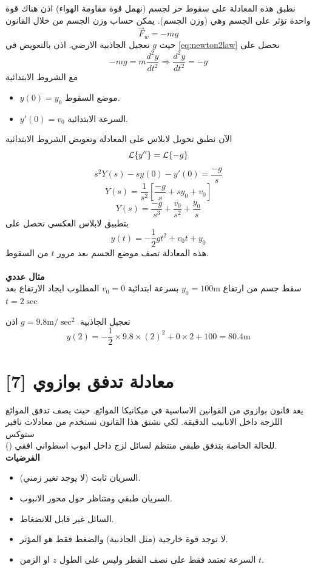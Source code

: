 نطبق هذه المعادلة على سقوط حر لجسم (نهمل قوة مقاومة الهواء) اذن هناك قوة واحدة تؤثر على الجسم وهي (وزن الجسم). يمكن حساب وزن الجسم من خلال القانون 
\[
\vec{F}_w = - mg
\]
حيث $g$ تعجيل الجاذبية الارضي. اذن بالتعويض في \eqref{eq:newton2law} نحصل على 
\begin{equation}
	\label{eq:freefall}
	- mg = m \frac{d^2 y}{dt^2} \Rightarrow \frac{d^2 y}{dt^2}  = -g
\end{equation}
مع الشروط الابتدائية
\begin{itemize}
	\item $y(0) = y_0$ موضع السقوط.
	\item $y'(0) = v_0$ السرعة الابتدائية.
\end{itemize}
الآن نطبق تحويل لابلاس على المعادلة وتعويض الشروط الابتدائية
\[
\mathcal{L}\{y''\} = \mathcal{L}\{-g\}
\]
\[
s^2Y(s) - s y(0) - y'(0) = \frac{-g}{s} 
\]
\[
Y(s) = \frac{1}{s^2} \left[\frac{-g}{s} + sy_0 + v_0\right]
\]
\[
Y(s) = \frac{-g}{s^3} + \frac{v_0}{s^2} + \frac{y_0}{s}
\]
بتطبيق لابلاس العكسي نحصل على
\begin{equation}
	\label{eq:motionsol}
	y(t) = -\frac{1}{2}gt^2 + v_0 t +y_0
\end{equation}
هذه المعادلة تصف موضع الجسم بعد مرور $t$ من السقوط.\\ \\
\noindent
\textbf{مثال عددي}\\
\noindent
سقط جسم من ارتفاع $y_0 = 100\text{m}$ بسرعة ابتدائية $v_0 = 0 $ المطلوب ايجاد الارتفاع بعد $t = 2\sec$
\begin{solution}
	تعجيل الجاذبية $g = 9.8 \text{m}/\sec^2$ اذن
	\[
	y(2) = -\frac{1}{2} \times 9.8 \times (2)^2 + 0 \times 2 + 100 = 80.4 \text{m}
	\]
\end{solution}

\section[معادلة تدفق بوازوي \en{Poiseuille's Flow Equation}]{معادلة تدفق بوازوي  [7]}
يعد قانون بوازوي من القوانين الاساسية في ميكانيكا الموائع. حيث يصف تدفق الموائع اللزجة داخل الانابيب الدقيقة. لكي نشتق هذا القانون نستخدم من معادلات نافير ستوكس \\() للحالة الخاصة بتدفق طبقي منتظم لسائل لزج داخل انبوب اسطواني افقي.\\
\noindent
\textbf{الفرضيات}
\begin{itemize}
	\item السريان ثابت (لا يوجد تغير زمني).
	\item السريان طبقي ومتناظر حول محور الانبوب.
	\item السائل غير قابل للانضغاط.
	\item لا توجد قوة خارجية (مثل الجاذبية) والضغط فقط هو المؤثر.
	\item السرعة تعتمد فقط على نصف القطر وليس على الطول $z$ او الزمن $t$.
\end{itemize}

